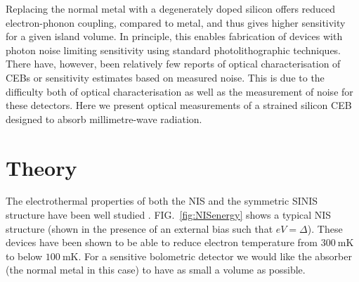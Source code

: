\documentclass[aip, apl, a4paper, amsmath,amssymb, reprint]{revtex4-1}
\begin{document}
Replacing the normal metal with a degenerately doped silicon offers reduced electron-phonon coupling, compared to metal, and thus gives higher sensitivity for a given island volume\cite{Leoni99}. In principle, this enables fabrication of devices with photon noise limiting sensitivity using standard photolithographic techniques. There have, however, been relatively few reports of optical characterisation of CEBs or sensitivity estimates based on measured noise. This is due to the difficulty both of optical characterisation as well as the measurement of noise for these detectors. Here we present optical measurements of a strained silicon CEB designed to absorb millimetre-wave radiation.

\section{Theory} \label{sec:Theory} 
The electrothermal properties of both the NIS and the symmetric SINIS structure have been well studied \cite{Pekola05, Nahum93, Nahum94, Leivo96, Savin01, Pekola04}. FIG.~\ref{fig:NISenergy} shows a typical NIS structure (shown in the presence of an external bias such that $eV = \Delta$). These devices have been shown\cite{Pekola04} to be able to reduce electron temperature from $300~\mathrm{mK}$ to below $100~\mathrm{mK}$. For a sensitive bolometric detector we would like the absorber (the normal metal in this case) to have as small a volume as possible.
\end{document}
